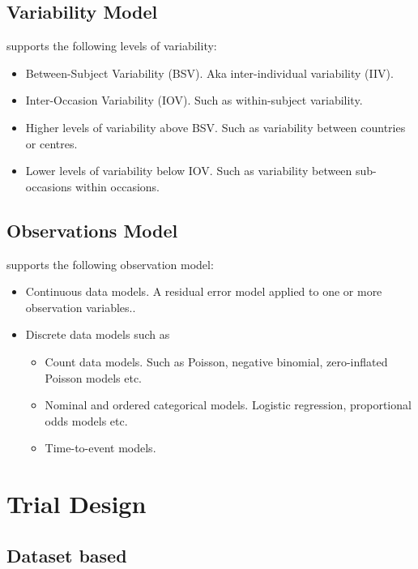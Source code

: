 \subsection{Variability Model}

\pharmml supports the following levels of variability:
\begin{itemize}
\item{Between-Subject Variability (BSV).} Aka inter-individual variability (IIV).
\item{Inter-Occasion Variability (IOV).} Such as within-subject variability.
\item{Higher levels of variability above BSV.} Such as variability between countries or centres.
\item{Lower levels of variability below IOV.} Such as variability between sub-occasions within occasions.
\end{itemize}

\subsection{Observations Model}

\pharmml supports the following observation model:
\begin{itemize}
\item{Continuous data models.} A residual error model applied to one or more observation variables..
\item{Discrete data models such as}
\begin{itemize}
\item{Count data models.} Such as Poisson, negative binomial, zero-inflated Poisson models etc.
\item{Nominal and ordered categorical models.} Logistic regression, proportional odds models etc.
\item{Time-to-event models.}
\end{itemize}
\end{itemize}

\section{Trial Design}

\subsection{Dataset based}

